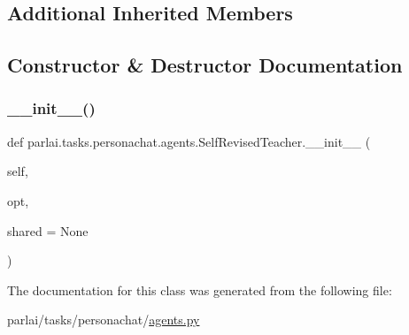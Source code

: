 \subsection*{Additional Inherited Members}


\subsection{Constructor \& Destructor Documentation}
\mbox{\label{classparlai_1_1tasks_1_1personachat_1_1agents_1_1SelfRevisedTeacher_a7d6545ffc585ee5edc99b2ce5a117aeb}} 
\subsubsection{\texorpdfstring{\+\_\+\+\_\+init\+\_\+\+\_\+()}{\_\_init\_\_()}}
{\footnotesize\ttfamily def parlai.\+tasks.\+personachat.\+agents.\+Self\+Revised\+Teacher.\+\_\+\+\_\+init\+\_\+\+\_\+ (\begin{DoxyParamCaption}\item[{}]{self,  }\item[{}]{opt,  }\item[{}]{shared = {\ttfamily None} }\end{DoxyParamCaption})}



The documentation for this class was generated from the following file\+:\begin{DoxyCompactItemize}
\item 
parlai/tasks/personachat/\hyperlink{parlai_2tasks_2personachat_2agents_8py}{agents.\+py}\end{DoxyCompactItemize}
